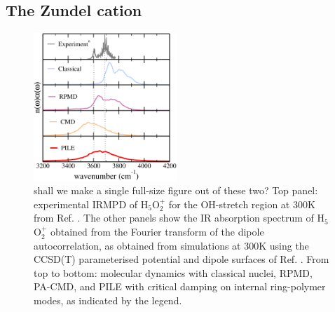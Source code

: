 \documentclass[aps,prb,superscriptaddress,amsmath,amssymb,showpacs,twocolumn]{revtex4}
\begin{document}

\subsection{The Zundel cation}

\begin{figure}[htbp]
\centering\includegraphics[width=0.48\textwidth]{figures/oh-stretch-300K.pdf}
\caption{{\color{red}  shall we make a single full-size figure out of these two?} 
Top panel: experimental IRMPD of H$_5$O$_2^+$ for the OH-stretch region at 300K from Ref. \cite{YehLee1989}.
The other panels show the IR absorption spectrum of H$_5$O$_2^+$ obtained from the Fourier transform of 
the dipole autocorrelation, as obtained from simulations at 300K using the CCSD(T) parameterised potential 
and dipole surfaces of Ref. \cite{HuangBraamsBowman2005}. From top to bottom:
 molecular dynamics with classical nuclei, RPMD, PA-CMD, and PILE with critical damping on internal ring-polymer modes,
as indicated by the legend.}
\label{fig:zundel-highf}
\end{figure}
\end{document}
